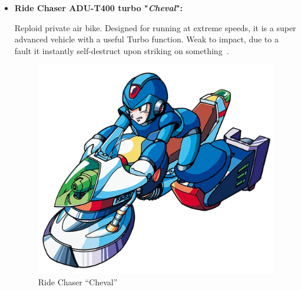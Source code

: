 \begin{itemize}
	
	\item \hypertarget{vehicle:Ride_Chaser_Cheval}{\textbf{Ride Chaser ADU-T400 turbo "\textit{Cheval}": }}
	Reploid private air bike. Designed for running at extreme speeds, 
	it is a super advanced vehicle with a useful Turbo function. Weak to impact, due to a fault it instantly self-destruct upon striking on something~\cite{wayback:X2_resources}.
	\begin{figure}[htp]
		\centering
		\includegraphics[height=\portraitsize]{figures/X2/weapons/RCCheval.png}
		\caption{Ride Chaser ``Cheval''}
	\end{figure}
	
	
	
	
\end{itemize}


